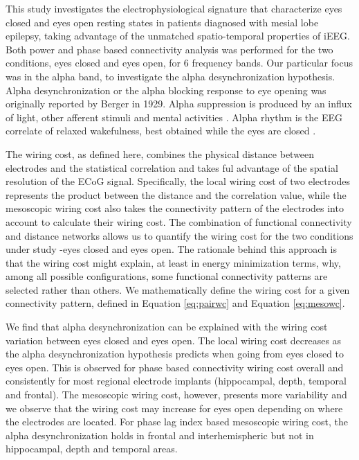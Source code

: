 \documentclass[11pt, onecolumn]{article}
\begin{document}
{This study investigates the electrophysiological signature that characterize eyes closed and eyes open resting states in patients  diagnosed with mesial lobe epilepsy, taking advantage of the unmatched spatio-temporal properties of iEEG. Both power and phase based connectivity analysis was performed for the two conditions, eyes closed and eyes open, for 6 frequency bands. Our particular focus was in the alpha band, to investigate the alpha desynchronization hypothesis.
Alpha desynchronization or the alpha blocking response to eye opening was originally reported by Berger in 1929. Alpha suppression is produced by an influx of light, other afferent stimuli and mental activities \citep{schomer2012niedermeyer}. Alpha rhythm is the EEG correlate of relaxed wakefulness, best obtained while the eyes are closed  \citep{niedermeyer2005electroencephalography}. 
 
The wiring cost, as defined here, combines the physical distance between electrodes and the statistical correlation and takes ful advantage of the spatial resolution of the ECoG signal. Specifically, the local wiring cost of two electrodes represents the product between the distance and the correlation value, while the mesoscopic wiring cost also takes the connectivity pattern of the electrodes into account to calculate their wiring cost. The combination of functional connectivity and distance networks allows us to quantify the wiring cost for the two conditions under study -eyes closed and eyes open.
The rationale behind this approach is that the wiring cost might explain, at least in energy minimization terms, why, among all possible configurations, some functional connectivity patterns are selected rather than others. We mathematically define the wiring cost for a given connectivity pattern, defined in Equation \ref{eq:pairwc} and Equation \ref{eq:mesowc}. 


We find that alpha desynchronization can be explained with the wiring cost variation between eyes closed and eyes open. The local wiring cost decreases as the alpha desynchronization hypothesis predicts when going from  eyes closed to eyes open. This is observed for phase based connectivity wiring cost overall and consistently for most regional electrode implants (hippocampal, depth, temporal and frontal). The mesoscopic wiring cost, however, presents more variability and we observe that the wiring cost may increase for eyes open depending on where the electrodes are located. For phase lag index based mesoscopic wiring cost,  the alpha desynchronization holds in frontal and interhemispheric but not in hippocampal, depth and temporal areas. 

}
\end{document}

